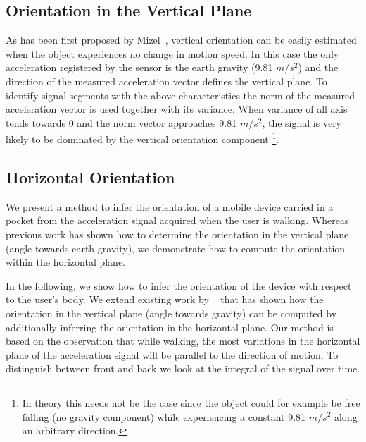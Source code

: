 \subsection{Orientation in the Vertical Plane}
As has been first proposed by Mizel~\cite{Mizell:2005p3885}, vertical
orientation can be easily estimated when the object experiences no
change in motion speed. In this case the only acceleration registered
by the sensor is the earth gravity (9.81 $m/s^2$) and the direction of
the measured acceleration vector defines the vertical plane. To
identify signal segments with the above characteristics the norm of
the measured acceleration vector is used together with its
variance. When variance of all axis tends towards 0 and the norm
vector approaches 9.81 $m/s^2$, the signal is very likely to be
dominated by the vertical orientation component \footnote{In theory
 this needs not be the case since the object could for example be
free falling (no gravity component) while experiencing a constant 9.81
$m/s^2$ along an arbitrary direction.}.
 
 \subsection{Horizontal Orientation}

We present a method to infer the orientation of a mobile device
carried in a pocket from the acceleration signal acquired when the
user is walking. Whereas previous work has shown how to determine the
orientation in the vertical plane (angle towards earth gravity), we
demonstrate how to compute the orientation within the horizontal
plane.

In the following, we show how to infer the orientation of the device with
respect to the user's body. We extend existing work by
~\cite{Mizell:2005p3885} that has shown how the orientation in the
vertical plane (angle towards gravity) can be computed by additionally
inferring the orientation in the horizontal plane. Our method is based
on the observation that while walking, the most variations in the
horizontal plane of the acceleration signal will be parallel to the
direction of motion. To distinguish between front and back we look at
the integral of the signal over time.

